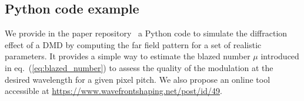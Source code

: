 \documentclass[12pt]{iopart}
\begin{document}
\subsection{Python code example}

We provide in the paper repository~\cite{github} a Python code
to simulate the diffraction effect of a DMD
by computing the far field pattern for a set of realistic parameters.
It provides a simple way to estimate the blazed number $\mu$ introduced in eq.~(\ref{eq:blazed_number})
to assess the quality of the modulation at the desired wavelength
for a given pixel pitch.
We also propose an online tool accessible at
\url{https://www.wavefrontshaping.net/post/id/49}.










\end{document}
